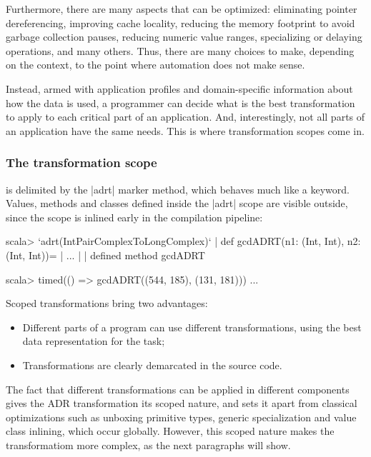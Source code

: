 Furthermore, there are many aspects that can be optimized: eliminating pointer dereferencing, improving cache locality, reducing the memory footprint to avoid garbage collection pauses, reducing numeric value ranges, specializing or delaying operations, and many others. Thus, there are many choices to make, depending on the context, to the point where automation does not make sense.

Instead, armed with application profiles and domain-specific information about how the data is used, a programmer can decide what is the best transformation to apply to each critical part of an application. And, interestingly, not all parts of an application have the same needs. This is where transformation scopes come in.

\subsubsection{The transformation scope} is delimited by the |adrt| marker method, which behaves much like a keyword. Values, methods and classes defined inside the |adrt| scope are visible outside, since the scope is inlined early in the compilation pipeline:

\begin{lstlisting-nobreak}
scala> `adrt(IntPairComplexToLongComplex)` {
       |   def gcdADRT(n1: (Int, Int), n2: (Int, Int))={
       |     ...
       |   }
       | }
defined method gcdADRT

scala> timed(() => gcdADRT((544, 185), (131, 181)))
...
\end{lstlisting-nobreak}

Scoped transformations bring two advantages:

\begin{itemize}
 \item Different parts of a program can use different transformations, using the best data representation for the task;
 \item Transformations are clearly demarcated in the source code.
\end{itemize}

The fact that different transformations can be applied in different components gives the ADR transformation its scoped nature, and sets it apart from classical optimizations such as unboxing primitive types, generic specialization and value class inlining, which occur globally. However, this scoped nature makes the transformatiom more complex, as the next paragraphs will show.

